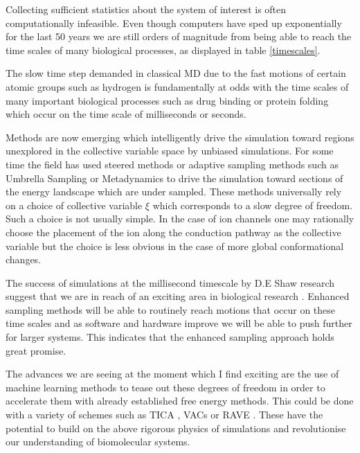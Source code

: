 Collecting sufficient statistics about the system of interest is often computationally infeasible. Even though computers have sped up exponentially for the last 50 years we are still orders of magnitude from being able to reach the time scales of many biological processes, as displayed in table \ref{timescales}.

The slow time step demanded in classical MD due to the fast motions of certain atomic groups such as hydrogen is fundamentally at odds with the time scales of many important biological processes such as drug binding or protein folding which occur on the time scale of  milliseconds or seconds.  

Methods are now emerging which intelligently drive the simulation toward regions unexplored in the collective variable space by unbiased simulations. For some time the field has used steered methods or adaptive sampling methods such as Umbrella Sampling or Metadynamics to drive the simulation toward sections of the energy landscape which are under sampled. These methods universally rely on a choice of collective variable $\xi$ which corresponds to a slow degree of freedom. Such a choice is not usually simple. In the case of ion channels one may rationally choose the placement of the ion along the conduction pathway as the collective variable but the choice is less obvious in the case of more global conformational changes.

The success of simulations at the millisecond timescale by D.E Shaw research suggest that we are in reach of an exciting area in biological research \cite{lindorff-larsen2016}. Enhanced sampling methods will be able to routinely reach motions that occur on these time scales and as software and hardware improve we will be able to push further for larger systems. This indicates that the enhanced sampling approach holds great promise.

The advances we are seeing at the moment which I find exciting are the use of machine learning methods to tease out these degrees of freedom in order to accelerate them with already established free energy methods. This could be done with a variety of schemes such as TICA \cite{noe2001, schultze2021}, VACs \cite{brotzakis2019} or RAVE \cite{ribeiro2018}. These have the potential to build on the above rigorous physics of simulations and revolutionise our understanding of biomolecular systems. 

